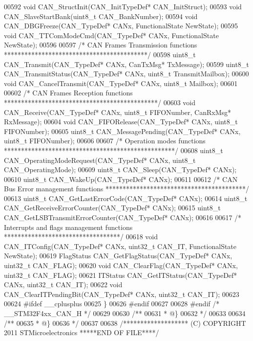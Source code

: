 \begin{DoxyCode}
00592 \textcolor{keywordtype}{void} CAN_StructInit(CAN\_InitTypeDef* CAN\_InitStruct);
00593 \textcolor{keywordtype}{void} CAN_SlaveStartBank(uint8\_t CAN\_BankNumber);
00594 \textcolor{keywordtype}{void} CAN_DBGFreeze(CAN\_TypeDef* CANx, FunctionalState NewState);
00595 \textcolor{keywordtype}{void} CAN_TTComModeCmd(CAN\_TypeDef* CANx, FunctionalState NewState);
00596 
00597 \textcolor{comment}{/* CAN Frames Transmission functions ******************************************/}
00598 uint8\_t CAN_Transmit(CAN\_TypeDef* CANx, CanTxMsg* TxMessage);
00599 uint8\_t CAN_TransmitStatus(CAN\_TypeDef* CANx, uint8\_t TransmitMailbox);
00600 \textcolor{keywordtype}{void} CAN_CancelTransmit(CAN\_TypeDef* CANx, uint8\_t Mailbox);
00601 
00602 \textcolor{comment}{/* CAN Frames Reception functions *********************************************/}
00603 \textcolor{keywordtype}{void} CAN_Receive(CAN\_TypeDef* CANx, uint8\_t FIFONumber, CanRxMsg* RxMessage);
00604 \textcolor{keywordtype}{void} CAN_FIFORelease(CAN\_TypeDef* CANx, uint8\_t FIFONumber);
00605 uint8\_t CAN_MessagePending(CAN\_TypeDef* CANx, uint8\_t FIFONumber);
00606 
00607 \textcolor{comment}{/* Operation modes functions **************************************************/}
00608 uint8\_t CAN_OperatingModeRequest(CAN\_TypeDef* CANx, uint8\_t CAN\_OperatingMode);
00609 uint8\_t CAN_Sleep(CAN\_TypeDef* CANx);
00610 uint8\_t CAN_WakeUp(CAN\_TypeDef* CANx);
00611 
00612 \textcolor{comment}{/* CAN Bus Error management functions *****************************************/}
00613 uint8\_t CAN_GetLastErrorCode(CAN\_TypeDef* CANx);
00614 uint8\_t CAN_GetReceiveErrorCounter(CAN\_TypeDef* CANx);
00615 uint8\_t CAN_GetLSBTransmitErrorCounter(CAN\_TypeDef* CANx);
00616 
00617 \textcolor{comment}{/* Interrupts and flags management functions **********************************/}
00618 \textcolor{keywordtype}{void} CAN_ITConfig(CAN\_TypeDef* CANx, uint32\_t CAN\_IT, FunctionalState NewState);
00619 FlagStatus CAN_GetFlagStatus(CAN\_TypeDef* CANx, uint32\_t CAN\_FLAG);
00620 \textcolor{keywordtype}{void} CAN_ClearFlag(CAN\_TypeDef* CANx, uint32\_t CAN\_FLAG);
00621 ITStatus CAN_GetITStatus(CAN\_TypeDef* CANx, uint32\_t CAN\_IT);
00622 \textcolor{keywordtype}{void} CAN_ClearITPendingBit(CAN\_TypeDef* CANx, uint32\_t CAN\_IT);
00623 
00624 \textcolor{preprocessor}{#}\textcolor{preprocessor}{ifdef} \_\_cplusplus
00625 \}
00626 \textcolor{preprocessor}{#}\textcolor{preprocessor}{endif}
00627 
00628 \textcolor{preprocessor}{#}\textcolor{preprocessor}{endif} \textcolor{comment}{/* \_\_STM32F4xx\_CAN\_H */}
00629 
00630 \textcolor{comment}{/**}
00631 \textcolor{comment}{  * @\}}
00632 \textcolor{comment}{  */}
00633 
00634 \textcolor{comment}{/**}
00635 \textcolor{comment}{  * @\}}
00636 \textcolor{comment}{  */}
00637 
00638 \textcolor{comment}{/******************* (C) COPYRIGHT 2011 STMicroelectronics *****END OF FILE****/}
\end{DoxyCode}

